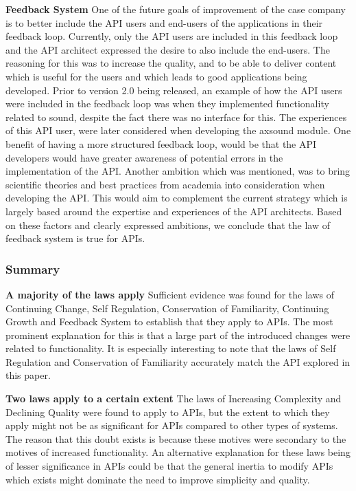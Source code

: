 \documentclass{sig-alternate}
\begin{document}
\smallskip \noindent
\textbf{Feedback System} 
One of the future goals of improvement of the case company is to better include the API users and end-users of the applications in their feedback loop. Currently, only the API users are included in this feedback loop and the API architect expressed the desire to also include the end-users. The reasoning for this was to increase the quality, and to be able to deliver content which is useful for the users and which leads to good applications being developed. Prior to version 2.0 being released, an example of how the API users were included in the feedback loop was when they implemented functionality related to sound, despite the fact there was no interface for this.  The experiences of this API user, were later considered when developing the axsound module. One benefit of having a more structured feedback loop, would be that the API developers would have greater awareness of potential errors in the implementation of the API. Another ambition which was mentioned, was to bring scientific theories and best practices from academia into consideration when developing the API. This would aim to complement the current strategy which is largely based around the expertise and experiences of the API architects. Based on these factors and clearly expressed ambitions, we conclude that the law of feedback system is true for APIs. 

\subsubsection{Summary}

\noindent
\textbf{A majority of the laws apply  } %
Sufficient evidence was found for the laws of Continuing Change, Self Regulation, Conservation of Familiarity, Continuing Growth and Feedback System to establish that they apply to APIs. The most prominent explanation for this is that a large part of the introduced changes were related to functionality. It is especially interesting to note that the laws of Self Regulation and Conservation of Familiarity accurately match the API explored in this paper. 

\smallskip \noindent
\textbf{Two laws apply to a certain extent  } %
The laws of Increasing Complexity and Declining Quality were found to apply to APIs, but the extent to which they apply might not be as significant for APIs compared to other types of systems. The reason that this doubt exists is because these motives were secondary to the motives of increased functionality. An alternative explanation for these laws being of lesser significance in APIs could be that the general inertia to modify APIs which exists \cite{google_talk} \cite{henning2007api} \cite{mcdonnell2013empirical} \cite{robbes2012developers} might dominate the need to improve simplicity and quality. 
\end{document}
